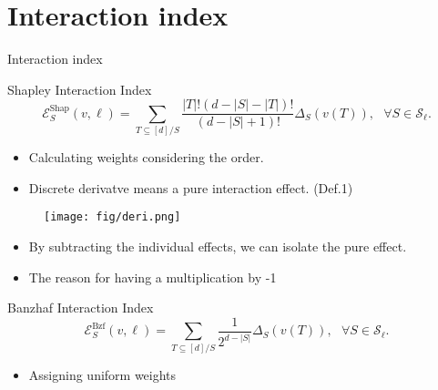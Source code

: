 \documentclass[10pt]{beamer}
\newcommand{\f}{v}
\newcommand{\ex}{\Expl}
\def\Expl{\mathcal{E}}
\newcommand{\setlessell}{\mathcal{S}_\ell }
\begin{document}
\section[Interaction index]{Interaction index}
\begin{frame}{Interaction index}
    \begin{mydefbox}{Shapley Interaction Index}
        \begin{equation*}
            \label{eqn:closed_form_shap_inter}
            \ex_S^{\text{Shap}}(\f, \ell) =  \sum_{T \subseteq [d]/ S}  \frac{|T|! (d-|S|-|T|)!}{(d-|S|+1)!} \Delta_S(\f(T)),\ \ \  
            \forall S \in \setlessell.
            \tag{5}
        \end{equation*}
    \end{mydefbox}
    \vspace{1.5em}
    \begin{itemize}[label=\scalebox{0.5}{$\blacksquare$}]
        \item Calculating weights considering the order.
        \item Discrete derivatve means a pure interaction effect. (Def.1)
    \end{itemize}
\end{frame}
\begin{frame}
    \begin{figure}[h]
    \centering
    \texttt{[image: fig/deri.png]}
    \end{figure}
    \vspace{1.5em}
    \begin{itemize}
        \item By subtracting the individual effects, we can isolate the pure effect.
        \item The reason for having a multiplication by -1
        
    \end{itemize}
\end{frame}
\begin{frame}
    \begin{mydefbox}{Banzhaf Interaction Index}
        \begin{equation*}
            \label{eqn:closed_form_bzf_inter}
            \ex^{\text{Bzf}}_S(\f,\ell) =  \sum_{T \subseteq [d]/S}  \frac{1}{2^{d-|S|}} \Delta_S(\f(T)),\ \ \  
            \forall  S \in \setlessell.
            \tag{6}
        \end{equation*}
    \end{mydefbox}
    \vspace{1.5em}
    \begin{itemize}[label=\scalebox{0.5}{$\blacksquare$}]
        \item Assigning uniform weights
    \end{itemize}
\end{frame}
\end{document}
